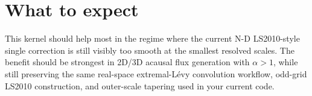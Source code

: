 \documentclass[11pt]{article}
\begin{document}
\section{What to expect}

This kernel should help most in the regime where the current N-D LS2010-style
single correction is still visibly too smooth at the smallest resolved scales.  The
benefit should be strongest in 2D/3D acausal flux generation with \(\alpha>1\),
while still preserving the same real-space extremal-L\'evy convolution workflow,
odd-grid LS2010 construction, and outer-scale tapering used in your current code.
\end{document}

